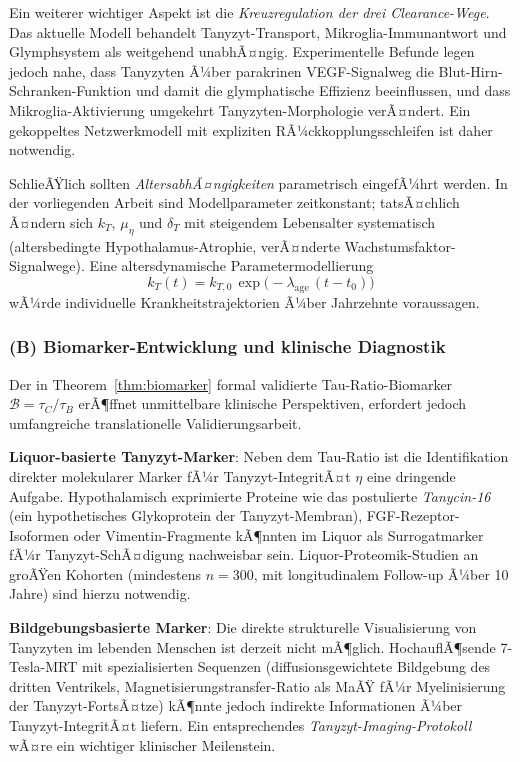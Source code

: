 ﻿\documentclass[12pt,a4paper]{article}
\theoremstyle{definition}
\begin{document}
	Ein weiterer wichtiger Aspekt ist die \emph{Kreuzregulation der drei Clearance-Wege}. Das aktuelle Modell behandelt Tanyzyt-Transport, Mikroglia-Immunantwort und Glymphsystem als weitgehend unabhÃ¤ngig. Experimentelle Befunde legen jedoch nahe, dass Tanyzyten Ã¼ber parakrinen VEGF-Signalweg die Blut-Hirn-Schranken-Funktion und damit die glymphatische Effizienz beeinflussen, und dass Mikroglia-Aktivierung umgekehrt Tanyzyten-Morphologie verÃ¤ndert. Ein gekoppeltes Netzwerkmodell mit expliziten RÃ¼ckkopplungsschleifen ist daher notwendig.

	SchlieÃŸlich sollten \emph{AltersabhÃ¤ngigkeiten} parametrisch eingefÃ¼hrt werden. In der vorliegenden Arbeit sind Modellparameter zeitkonstant; tatsÃ¤chlich Ã¤ndern sich $k_T$, $\mu_\eta$ und $\delta_T$ mit steigendem Lebensalter systematisch (altersbedingte Hypothalamus-Atrophie, verÃ¤nderte Wachstumsfaktor-Signalwege). Eine altersdynamische Parametermodellierung
	\[
	k_T(t) = k_{T,0}\,\exp\!\bigl(-\lambda_{\text{age}}\,(t - t_0)\bigr)
	\]
	wÃ¼rde individuelle Krankheitstrajektor\-ien Ã¼ber Jahrzehnte voraussagen.

	\subsubsection*{(B) Biomarker-Entwicklung und klinische Diagnostik}

	Der in Theorem~\ref{thm:biomarker} formal validierte Tau-Ratio-Biomarker $\mathcal{B} = \tau_C/\tau_B$ erÃ¶ffnet unmittelbare klinische Perspektiven, erfordert jedoch umfangreiche translationelle Validierungsarbeit.

	\textbf{Liquor-basierte Tanyzyt-Marker}: Neben dem Tau-Ratio ist die Identifikation direkter molekularer Marker fÃ¼r Tanyzyt-IntegritÃ¤t $\eta$ eine dringende Aufgabe. Hypothalamisch exprimierte Proteine wie das postulierte \emph{Tanycin-16} (ein hypothetisches Glykoprotein der Tanyzyt-Membran), FGF-Rezeptor-Isoformen oder Vimentin-Fragmente kÃ¶nnten im Liquor als Surrogatmarker fÃ¼r Tanyzyt-SchÃ¤digung nachweisbar sein. Liquor-Proteomik-Studien an groÃŸen Kohorten (mindestens $n = 300$, mit longitudinalem Follow-up Ã¼ber 10 Jahre) sind hierzu notwendig.

	\textbf{Bildgebungsbasierte Marker}: Die direkte strukturelle Visualisierung von Tanyzyten im lebenden Menschen ist derzeit nicht mÃ¶glich. HochauflÃ¶sende 7-Tesla-MRT mit spezialisierten Sequenzen (diffusionsgewichtete Bildgebung des dritten Ventrikels, Magnetisierungstransfer-Ratio als MaÃŸ fÃ¼r Myelinisierung der Tanyzyt-FortsÃ¤tze) kÃ¶nnte jedoch indirekte Informationen Ã¼ber Tanyzyt-IntegritÃ¤t liefern. Ein entsprechendes \emph{Tanyzyt-Imaging-Protokoll} wÃ¤re ein wichtiger klinischer Meilenstein.
\end{document}
